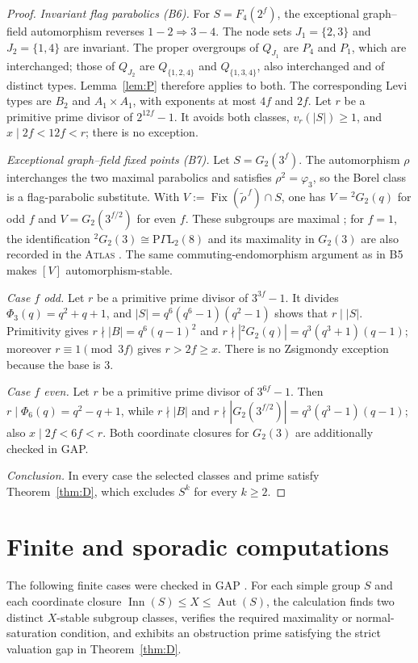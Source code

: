 \documentclass[11pt]{amsart}
\theoremstyle{definition}
\theoremstyle{remark}
\DeclareMathOperator{\Inn}{Inn}
\DeclareMathOperator{\Aut}{Aut}
\DeclareMathOperator{\Fix}{Fix}
\newcommand{\vp}[1]{v_{#1}}
\begin{document}
\begin{proof}
\emph{Invariant flag parabolics (B6).}
For $S=F_4(2^f)$, the exceptional graph--field automorphism reverses
$1\!-\!2\Rightarrow3\!-\!4$. The node sets $J_1=\{2,3\}$ and
$J_2=\{1,4\}$ are invariant. The proper overgroups of $Q_{J_1}$ are
$P_4$ and $P_1$, which are interchanged; those of $Q_{J_2}$ are
$Q_{\{1,2,4\}}$ and $Q_{\{1,3,4\}}$, also interchanged and of distinct
types. Lemma~\ref{lem:P} therefore applies to both. The corresponding Levi types are $B_2$ and $A_1{\times}A_1$,
with exponents at most $4f$ and $2f$.
Let $r$ be a primitive prime divisor of $2^{12f}-1$. It avoids both
classes, $\vp{r}(|S|)\geq1$, and $x\mid2f<12f<r$; there is no exception.

\emph{Exceptional graph--field fixed points (B7).}
Let $S=G_2(3^f)$. The automorphism $\rho$ interchanges the two maximal
parabolics and satisfies $\rho^2=\varphi_3$, so the Borel class is a
flag-parabolic substitute. With
$V:=\Fix(\widetilde\rho^{\,f})\cap S$, one has $V={}^2G_2(q)$ for odd $f$
and $V=G_2(3^{f/2})$ for even $f$. These subgroups are maximal
\cite[Thm.~A, p.~33]{Kleidman1988}; for $f=1$, the identification
${}^2G_2(3)\cong\mathrm{P}\Gamma\mathrm{L}_2(8)$ and its maximality in
$G_2(3)$ are also recorded in the \textsc{Atlas} \cite{ATLAS}. The same
commuting-endomorphism argument as in B5 makes $[V]$ automorphism-stable.

\emph{Case $f$ odd.} Let $r$ be a primitive prime divisor of $3^{3f}-1$.
It divides $\Phi_3(q)=q^2+q+1$, and $|S|=q^6(q^6-1)(q^2-1)$ shows that
$r\mid|S|$. Primitivity gives $r\nmid|B|=q^6(q-1)^2$ and
$r\nmid|{}^2G_2(q)|=q^3(q^3+1)(q-1)$; moreover
$r\equiv1\pmod{3f}$ gives $r>2f\geq x$. There is no Zsigmondy exception
because the base is $3$.

\emph{Case $f$ even.} Let $r$ be a primitive prime divisor of $3^{6f}-1$.
Then $r\mid\Phi_6(q)=q^2-q+1$, while
$r\nmid|B|$ and
$r\nmid|G_2(3^{f/2})|=q^3(q^3-1)(q-1)$; also $x\mid2f<6f<r$.
Both coordinate closures for $G_2(3)$ are additionally checked in GAP.

\emph{Conclusion.} In every case the selected classes and prime satisfy
Theorem~\ref{thm:D}, which excludes $S^k$ for every $k\geq2$.
\end{proof}


\section{Finite and sporadic computations}\label{app:finite}

The following finite cases were checked in GAP \cite{GAP}. For each simple
group $S$ and each coordinate closure $\Inn(S)\leq X\leq\Aut(S)$, the
calculation finds two distinct $X$-stable subgroup classes, verifies the
required maximality or normal-saturation condition, and exhibits an
obstruction prime satisfying the strict valuation gap in
Theorem~\ref{thm:D}.
\end{document}

